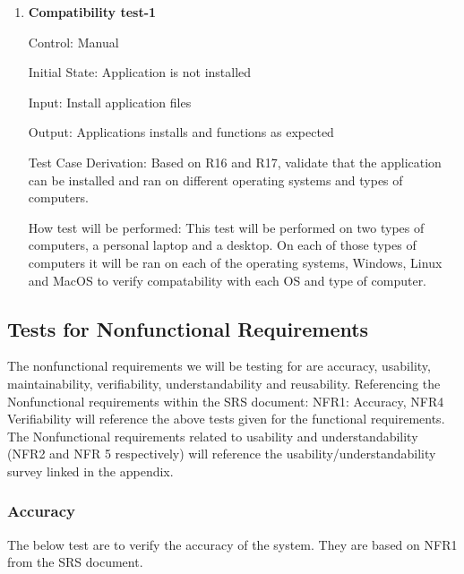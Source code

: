 \documentclass[12pt, titlepage]{article}
\begin{document}
  \begin{enumerate}
    \item {} \hypertarget{Compatibility test-1}{\textbf{Compatibility test-1}} \label{Compatability test-1}
  
  Control: Manual
            
  Initial State: Application is not installed
            
  Input: Install application files
            
  Output: Applications installs and functions as expected
  
  Test Case Derivation: Based on R16 and R17, validate that the application can be installed and ran on different operating systems and types of computers. 
  
  How test will be performed: This test will be performed on two types of computers, a personal laptop and a desktop. On each of those types of computers it will be ran on each of the operating systems, Windows, Linux and MacOS to verify compatability with each OS and type of computer.

  \end{enumerate}

\subsection{Tests for Nonfunctional Requirements}

\noindent The nonfunctional requirements we will be testing for are accuracy, usability, maintainability, verifiability, understandability and reusability. 
Referencing the Nonfunctional requirements within the SRS document: NFR1: Accuracy, NFR4 Verifiability will reference the above tests given for the functional requirements. 
The Nonfunctional requirements related to usability and understandability (NFR2 and NFR 5 respectively) will reference the usability/understandability survey linked in the appendix.

\subsubsection{Accuracy}

The below test are to verify the accuracy of the system.
They are based on NFR1 from the SRS document.
\end{document}
